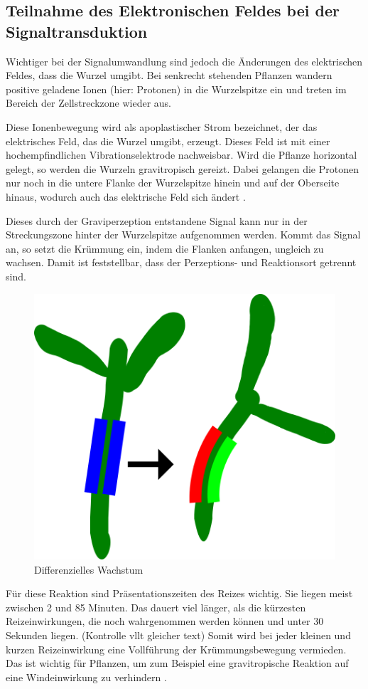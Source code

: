 \documentclass[
a4paper, 
11pt, 
ngerman,
listof=totoc,
bibliography=totocnumbered,
abstracton
]{scrreprt}
\begin{document}
\subsection{Teilnahme des Elektronischen Feldes bei der Signaltransduktion}

Wichtiger bei der Signalumwandlung sind jedoch die Änderungen des elektrischen Feldes, dass die Wurzel umgibt.
Bei senkrecht stehenden Pflanzen wandern positive geladene Ionen (hier: Protonen) in die Wurzelspitze ein und treten im Bereich der Zellstreckzone wieder aus.

Diese Ionenbewegung wird als apoplastischer Strom bezeichnet, der das elektrisches Feld, das die Wurzel umgibt, erzeugt. Dieses Feld ist mit einer hochempfindlichen Vibrationselektrode nachweisbar. 
Wird die Pflanze horizontal gelegt, so werden die Wurzeln gravitropisch gereizt. Dabei gelangen die Protonen nur noch in die untere Flanke der Wurzelspitze hinein und auf der Oberseite hinaus, wodurch auch das elektrische Feld sich ändert \parencite[502f]{Nultsch}.



Dieses durch der Graviperzeption entstandene Signal kann nur in der Streckungszone hinter der Wurzelspitze aufgenommen werden. Kommt das Signal an, so setzt die Krümmung ein, indem die Flanken anfangen, ungleich zu wachsen. Damit ist feststellbar, dass der Perzeptions- und Reaktionsort getrennt sind.

\begin{figure}[H]
	\centering 
	\includegraphics[width = 0.3\linewidth]{bilder/diff.png}
	\caption{Differenzielles Wachstum}
\end{figure} 


Für diese Reaktion sind Präsentationszeiten des Reizes wichtig. Sie liegen meist zwischen 2 und 85 Minuten. Das dauert viel länger, als die kürzesten Reizeinwirkungen, die noch wahrgenommen werden können und unter 30 Sekunden liegen. (Kontrolle vllt gleicher text)
Somit wird bei jeder kleinen und kurzen Reizeinwirkung eine Vollführung der Krümmungsbewegung vermieden. Das ist wichtig für Pflanzen, um zum Beispiel eine gravitropische Reaktion auf eine Windeinwirkung zu verhindern \parencite[531]{Luettge}.
\end{document}
